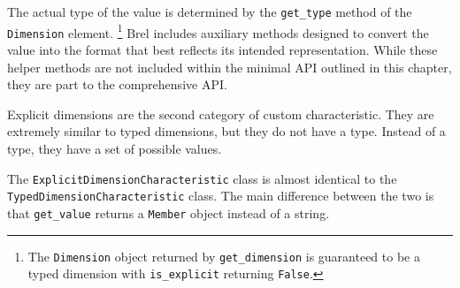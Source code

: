 The actual type of the value is determined by the \texttt{get\_type} method of the \texttt{Dimension} element.
\footnote{The \texttt{Dimension} object returned by \texttt{get\_dimension} is guaranteed to be a typed dimension with \texttt{is\_explicit} returning \texttt{False}.}
Brel includes auxiliary methods designed to convert the value into the format that best reflects its intended representation.
While these helper methods are not included within the minimal API outlined in this chapter, they are part to the comprehensive API.

Explicit dimensions are the second category of custom characteristic.
They are extremely similar to typed dimensions, but they do not have a type.
Instead of a type, they have a set of possible values.

The \texttt{ExplicitDimensionCharacteristic} class is almost identical to the \texttt{TypedDimensionCharacteristic} class.
The main difference between the two is that \texttt{get\_value} returns a \texttt{Member} object instead of a string.

